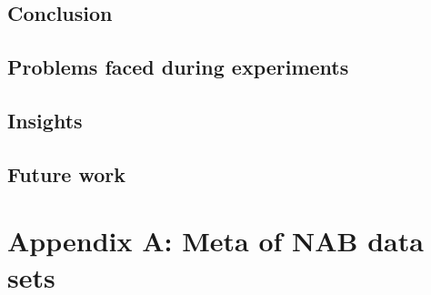 \documentclass[12pt]{article}
\begin{document}
\subsection{Conclusion}
\subsection{Problems faced during experiments}
\subsection{Insights}
\subsection{Future work}
\newpage
\section{Appendix A: Meta of NAB data sets}
\label{appendixA}
\end{document}
